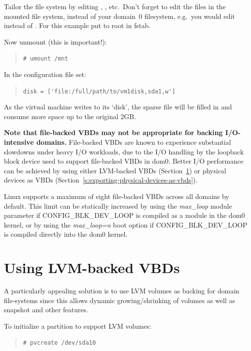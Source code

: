 \documentclass[11pt,twoside,final,openright]{report}
\begin{document}
Tailor the file system by editing ,
, etc.\ Don't forget to edit the files in the
mounted file system, instead of your domain~0 filesystem, e.g.\ you
would edit  instead of .  For
this example put  to root in fstab.

Now unmount (this is important!):
\begin{quote}
  \verb_# umount /mnt_
\end{quote}

In the configuration file set:
\begin{quote}
  \verb_disk = ['file:/full/path/to/vm1disk,sda1,w']_
\end{quote}

As the virtual machine writes to its `disk', the sparse file will be
filled in and consume more space up to the original 2GB.

{\bf Note that file-backed VBDs may not be appropriate for backing
  I/O-intensive domains.}  File-backed VBDs are known to experience
substantial slowdowns under heavy I/O workloads, due to the I/O
handling by the loopback block device used to support file-backed VBDs
in dom0.  Better I/O performance can be achieved by using either
LVM-backed VBDs (Section~\ref{s:using-lvm-backed-vbds}) or physical
devices as VBDs (Section~\ref{s:exporting-physical-devices-as-vbds}).

Linux supports a maximum of eight file-backed VBDs across all domains
by default.  This limit can be statically increased by using the
\emph{max\_loop} module parameter if CONFIG\_BLK\_DEV\_LOOP is
compiled as a module in the dom0 kernel, or by using the
\emph{max\_loop=n} boot option if CONFIG\_BLK\_DEV\_LOOP is compiled
directly into the dom0 kernel.


\section{Using LVM-backed VBDs}
\label{s:using-lvm-backed-vbds}

A particularly appealing solution is to use LVM volumes as backing for
domain file-systems since this allows dynamic growing/shrinking of
volumes as well as snapshot and other features.

To initialize a partition to support LVM volumes:
\begin{quote}
\begin{verbatim}
# pvcreate /dev/sda10           
\end{verbatim} 
\end{quote}
\end{document}
